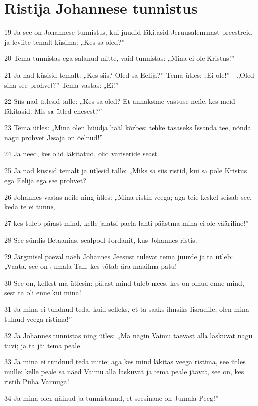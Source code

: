 \section*{Ristija Johannese tunnistus}

\par 19 Ja see on Johannese tunnistus, kui juudid läkitasid Jeruusalemmast preestreid ja leviite temalt küsima: „Kes sa oled?”
\par 20 Tema tunnistas ega salanud mitte, vaid tunnistas: „Mina ei ole Kristus!”
\par 21 Ja nad küsisid temalt: „Kes siis? Oled sa Eelija?” Tema ütles: „Ei ole!” - „Oled sina see prohvet?” Tema vastas: „Ei!”
\par 22 Siis nad ütlesid talle: „Kes sa oled? Et annaksime vastuse neile, kes meid läkitasid. Mis sa ütled enesest?”
\par 23 Tema ütles: „Mina olen hüüdja hääl kõrbes: tehke tasaseks Issanda tee, nõnda nagu prohvet Jesaja on öelnud!”
\par 24 Ja need, kes olid läkitatud, olid variseride seast.
\par 25 Ja nad küsisid temalt ja ütlesid talle: „Miks sa siis ristid, kui sa pole Kristus ega Eelija ega see prohvet?
\par 26 Johannes vastas neile ning ütles: „Mina ristin veega; aga teie keskel seisab see, keda te ei tunne,
\par 27 kes tuleb pärast mind, kelle jalatsi paela lahti päästma mina ei ole vääriline!”
\par 28 See sündis Betaanias, sealpool Jordanit, kus Johannes ristis.
\par 29 Järgmisel päeval näeb Johannes Jeesust tulevat tema juurde ja ta ütleb: „Vaata, see on Jumala Tall, kes võtab ära maailma patu!
\par 30 See on, kellest ma ütlesin: pärast mind tuleb mees, kes on olnud enne mind, sest ta oli enne kui mina!
\par 31 Ja mina ei tundnud teda, kuid selleks, et ta saaks ilmsiks Iisraelile, olen mina tulnud veega ristima!”
\par 32 Ja Johannes tunnistas ning ütles: „Ma nägin Vaimu taevast alla laskuvat nagu tuvi; ja ta jäi tema peale.
\par 33 Ja mina ei tundnud teda mitte; aga kes mind läkitas veega ristima, see ütles mulle: kelle peale sa näed Vaimu alla laskuvat ja tema peale jäävat, see on, kes ristib Püha Vaimuga!
\par 34 Ja mina olen näinud ja tunnistanud, et seesinane on Jumala Poeg!”

